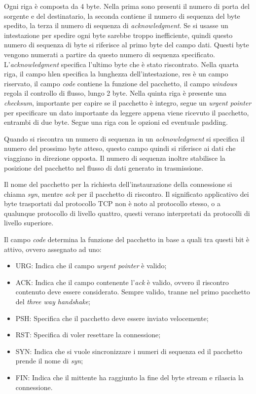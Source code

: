 \documentclass{article}
\numberwithin{equation}{subsection}
\begin{document}
Ogni riga è composta da 4 byte. Nella prima sono presenti il numero di porta del sorgente e del destinatario, la seconda contiene il numero di sequenza del byte spedito, 
la terza il numero di sequenza di \textit{acknowledgment}. 
Se si usasse un intestazione per spedire ogni byte sarebbe troppo inefficiente, quindi questo numero di sequenza di byte si riferisce al primo byte del campo dati. 
Questi byte vengono numerati a partire da questo numero di sequenza specificato. L'\textit{acknowledgment} specifica l'ultimo byte che è stato riscontrato. 
Nella quarta riga, il campo hlen specifica la lunghezza dell'intestazione, res è un campo riservato, il campo \textit{code} contiene la funzione del pacchetto, il campo \textit{windows} regola il 
controllo di flusso, lungo 2 byte. 
Nella quinta riga è presente una \textit{checksum}, importante per capire se il pacchetto è integro, segue un \textit{urgent pointer} per specificare un dato importante da 
leggere appena viene ricevuto il pacchetto, entrambi di due byte. Segue una riga con le opzioni ed eventuale padding. 

Quando si riscontra un numero di sequenza in un \textit{acknowledgment} si specifica il numero del prossimo byte atteso, questo campo quindi si riferisce ai dati che viaggiano 
in direzione opposta. Il numero di sequenza inoltre stabilisce la posizione del pacchetto nel flusso di dati generato in trasmissione. 

Il nome del pacchetto per la richiesta dell'instaurazione della connessione si chiama \textit{syn}, mentre \textit{ack} per il pacchetto di riscontro. Il significato applicativo 
dei byte trasportati dal protocollo \textcolor{Bittersweet}{TCP} non è noto al protocollo stesso, o a qualunque protocollo di livello quattro, questi verano interpretati da protocolli di livello superiore. 

Il campo \textit{code} determina la funzione del pacchetto in base a quali tra questi bit è attivo, ovvero assegnato ad uno:
\begin{itemize}
    \item URG: Indica che il campo \textit{urgent pointer} è valido;
    \item ACK: Indica che il campo contenente l'\textit{ack} è valido, ovvero il riscontro contenuto deve essere considerato. Sempre valido, tranne nel primo pacchetto del \textit{three way handshake};
    \item PSH: Specifica che il pacchetto deve essere inviato velocemente;
    \item RST: Specifica di voler resettare la connessione;
    \item SYN: Indica che si vuole sincronizzare i numeri di sequenza ed il pacchetto prende il nome di \textit{syn};
    \item FIN: Indica che il mittente ha raggiunto la fine del byte stream e rilascia la connessione. 
\end{itemize}
\end{document}
